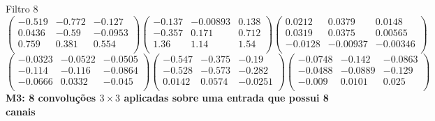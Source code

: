 Filtro 8
{ \small
\[
\begin{pmatrix}
  -0.519 & -0.772 & -0.127 \\
  0.0436 & -0.59 & -0.0953 \\
  0.759 & 0.381 & 0.554 \\
\end{pmatrix}
\begin{pmatrix}
  -0.137 & -0.00893 & 0.138 \\
  -0.357 & 0.171 & 0.712 \\
  1.36 & 1.14 & 1.54 \\
\end{pmatrix}
\begin{pmatrix}
  0.0212 & 0.0379 & 0.0148 \\
  0.0319 & 0.0375 & 0.00565 \\
  -0.0128 & -0.00937 & -0.00346 \\
\end{pmatrix}
\]
\[
\begin{pmatrix}
  -0.0323 & -0.0522 & -0.0505 \\
  -0.114 & -0.116 & -0.0864 \\
  -0.0666 & 0.0332 & -0.045 \\
\end{pmatrix}
\begin{pmatrix}
  -0.547 & -0.375 & -0.19 \\
  -0.528 & -0.573 & -0.282 \\
  0.0142 & 0.0574 & -0.0251 \\
\end{pmatrix}
\begin{pmatrix}
  -0.0748 & -0.142 & -0.0863 \\
  -0.0488 & -0.0889 & -0.129 \\
  -0.009 & 0.0101 & 0.025 \\
\end{pmatrix}
\]
}
\textbf{M3: 8 convoluções $3 \times 3$ aplicadas sobre uma entrada que 
possui 8 canais}

